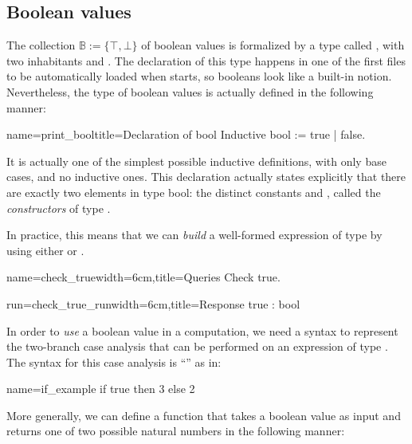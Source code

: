 \subsection{Boolean values}\label{ssec:boolval}

The collection $\mathbb{B} := \{\top, \bot\}$ of boolean values is
formalized by a type called , with two inhabitants 
and . The declaration of this type happens
in one of the first files to be automatically loaded when \Coq{} starts,
so booleans look like a built-in notion.  Nevertheless, the type of
boolean values is actually defined in the following manner:

\begin{coq}{name=print_bool}{title=Declaration of bool}
Inductive bool := true | false.
\end{coq}

It is actually one of the simplest possible inductive definitions,
with only base cases, and no inductive ones. This
declaration actually states explicitly that there are exactly two
elements in type bool: the distinct constants  and ,
called the \emph{constructors} of type .



In practice, this means that we can \emph{build} a well-formed expression of
type  by using either  or .

\begin{coq}{name=check_true}{width=6cm,title=Queries}
Check true.
\end{coq}
\begin{coqout}{run=check_true_run}{width=6cm,title=Response}
true : bool
\end{coqout}

In order to \emph{use} a boolean value in a computation, we need a
syntax to represent the two-branch case analysis that can be performed
on an expression of type . The \Coq{} syntax for this case analysis is
``'' as in:

\begin{coq}{name=if_example}{}
if true then 3 else 2
\end{coq}
More generally, we can define a function that takes a boolean value as
input and returns one of two possible natural numbers in the following
manner:


